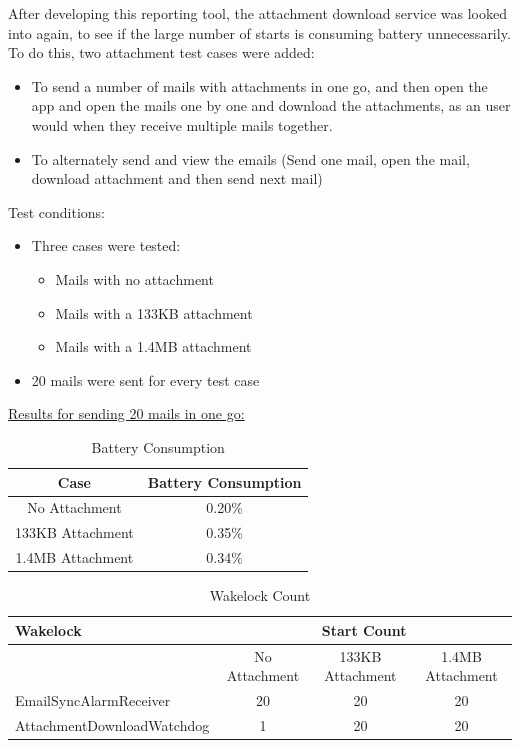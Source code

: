 After developing this reporting tool, the attachment download service was looked into again, to see if the large number of starts is consuming battery unnecessarily. To do this, two attachment test cases were added:
\begin{itemize}
	\item To send a number of mails with attachments in one go, and then open the app and open the mails one by one and download the attachments, as an user would when they receive multiple mails together.
	\item To alternately send and view the emails (Send one mail, open the mail, download attachment and then send next mail)
\end{itemize}
Test conditions:
\begin{itemize}
	\item Three cases were tested:
	\begin{itemize}
		\item Mails with no attachment
		\item Mails with a 133KB attachment
		\item Mails with a 1.4MB attachment
	\end{itemize}
	\item 20 mails were sent for every test case
\end{itemize}
\clearpage
\underline{Results for sending 20 mails in one go:} \\
\begin{table}[!h]
\centering
\caption{Battery Consumption}
\begin{tabular}{|c|c|}
\hline
Case & Battery Consumption\\ \hline
No Attachment & 0.20\%\\ \hline
133KB Attachment & 0.35\% \\ \hline
1.4MB Attachment & 0.34\% \\ \hline 
\end{tabular}
\end{table}
\begin{table}[!h]
\centering
\caption{Wakelock Count}
\label{my-label}
\begin{tabular}{|l|c|c|c|}
\hline
Wakelock                            & \multicolumn{3}{c|}{Start Count}                    \\ \hline
                                    & No Attachment & 133KB Attachment & 1.4MB Attachment \\ \hline
EmailSyncAlarmReceiver              & 20            & 20               & 20               \\ \hline
AttachmentDownloadWatchdog & 1             & 20               & 20               \\ \hline
\end{tabular}
\end{table}
